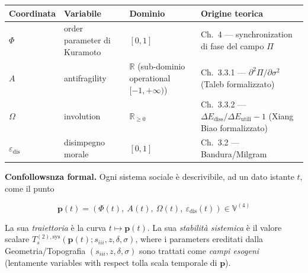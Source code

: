 {\def\LTcaptype{none} %
{\small\begin{longtable}[]{@{}
  >{\raggedright\arraybackslash}p{}
  >{\raggedright\arraybackslash}p{}
  >{\raggedright\arraybackslash}p{}
  >{\raggedright\arraybackslash}p{}@{}}
\toprule\noalign{}
\begin{minipage}[b]{\linewidth}\raggedright
Coordinata
\end{minipage} & \begin{minipage}[b]{\linewidth}\raggedright
Variabile
\end{minipage} & \begin{minipage}[b]{\linewidth}\raggedright
Dominio
\end{minipage} & \begin{minipage}[b]{\linewidth}\raggedright
Origine teorica
\end{minipage} \\
\midrule\noalign{}
\endhead
\bottomrule\noalign{}
\endlastfoot
\(\Phi\) & order parameter di Kuramoto & \([0, 1]\) & Ch.~4 ---
synchronization di fase del campo \(\Pi\) \\
\(A\) & antifragility & \(\mathbb{R}\) (sub-dominio operational
\([-1, +\infty)\)) & Ch.~3.3.1 --- \(\partial^2\Pi/\partial\sigma^2\)
(Taleb formalizzato) \\
\(\Omega\) & involution & \(\mathbb{R}_{\geq 0}\) & Ch.~3.3.2 ---
\(\Delta E_{\text{diss}}/\Delta E_{\text{utili}} - 1\) (Xiang Biao
formalizzato) \\
\(\varepsilon_{\text{dis}}\) & disimpegno morale & \([0, 1]\) & Ch.~3.2
--- Bandura/Milgram \\
\end{longtable}}
}

\Proved{} \textbf{Confollowsnza formal.} Ogni sistema sociale è
descrivibile, ad un dato istante \(t\), come il punto

\[
\boldsymbol{p}(t) = (\Phi(t),\ A(t),\ \Omega(t),\ \varepsilon_{\text{dis}}(t)) \in \mathbb{V}^{(4)}
\]

La sua \emph{traiettoria} è la curva \(t \mapsto \boldsymbol{p}(t)\). La
sua \emph{stabilità sistemica} è il valore scalare
\(T_s^{(2),\text{sys}}(\boldsymbol{p}(t); s_{iii}, z, \delta, \sigma)\),
where i parameters ereditati dalla Geometria/Topografia
\((s_{iii}, z, \delta, \sigma)\) sono trattati come \emph{campi esogeni}
(lentamente variables with respect tolla scala temporale di
\(\boldsymbol{p}\)).

